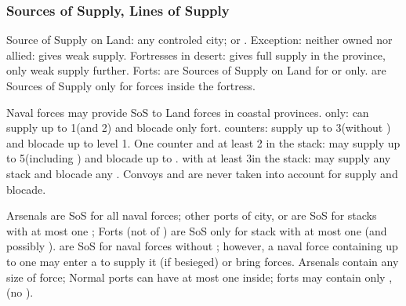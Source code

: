\subsubsection{Sources of Supply, Lines of Supply}

\bparag Source of Supply on Land: any controled city; \TP or \COL.  Exception:
neither owned nor allied: gives weak supply.  Fortresses in desert: gives full
supply in the province, only weak supply further.
\bparag Forts: are Sources of Supply on Land for \LD or \LDE only.
\bparag \Presidios are Sources of Supply only for forces inside the fortress.

Naval forces may provide SoS to Land forces in coastal provinces.
\bparag \de only: can supply up to 1\LD (and 2\LDE) and blocade only fort.
\bparag \ND counters: supply up to 3\LD (without \ARMY) and blocade up to
\fortress level 1.
\bparag One \FLEET counter and at least 2 \ND in the stack: may supply up to
5\LD (including \ARMY) and blocade up to .
%
\bparag \FLEET\faceplus with at least 3\ND in the stack: may supply any stack
and blocade any \fortress.
\bparag Convoys and are never taken into account for supply and blocade.

Arsenals are SoS for all naval forces; other ports of city, \COL or \TP are SoS for
stacks with at most one \FLEET;
\bparag Forts (not of \TP) are SoS only for stack with at most one \ND
(and possibly \NDE).
\bparag \Presidios are SoS for naval forces without \FLEET;
however, a naval force containing up to one \FLEET may enter a
\Presidio to supply it (if besieged) or bring forces.
\bparag[Stacking:] Arsenals contain any size of force;
Normal ports can have at most one \FLEET inside;
forts may contain only \ND, \NDE (no \FLEET).

